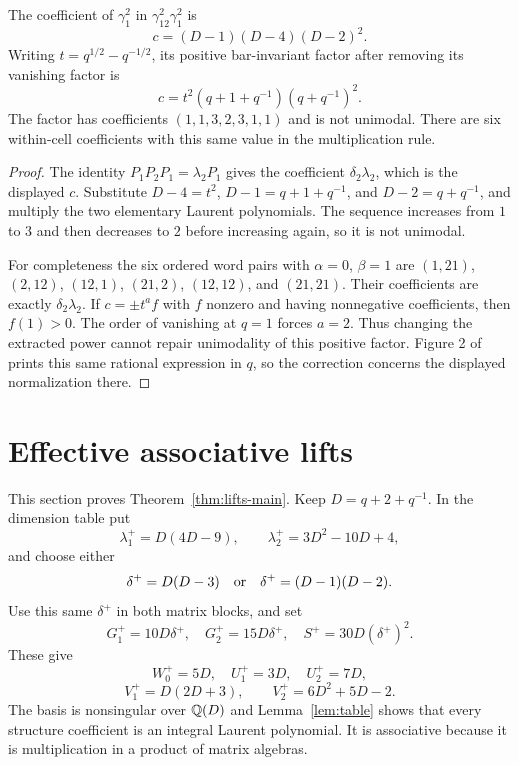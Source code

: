 \documentclass[11pt]{article}
\theoremstyle{definition}\newtheorem{definition}[theorem]{Definition}
\begin{document}
\begin{proposition}\label{prop:unimodality}
The coefficient of $\gamma_1^2$ in $\gamma_{12}^2\gamma_1^2$ is
\[
 c=(D-1)(D-4)(D-2)^2.
\]
Writing $t=q^{1/2}-q^{-1/2}$, its positive bar-invariant factor after removing its vanishing factor is
\[
 c=t^2(q+1+q^{-1})(q+q^{-1})^2.
\]
The factor has coefficients $(1,1,3,2,3,1,1)$ and is not unimodal. There are six within-cell coefficients with this same value in the multiplication rule.
\end{proposition}
\begin{proof}
The identity $P_1P_2P_1=\lambda_2P_1$ gives the coefficient $\delta_2\lambda_2$, which is the displayed $c$. Substitute $D-4=t^2$, $D-1=q+1+q^{-1}$, and $D-2=q+q^{-1}$, and multiply the two elementary Laurent polynomials. The sequence increases from $1$ to $3$ and then decreases to $2$ before increasing again, so it is not unimodal.

For completeness the six ordered word pairs with $\alpha=0$, $\beta=1$ are $(1,21)$, $(2,12)$, $(12,1)$, $(21,2)$, $(12,12)$, and $(21,21)$. Their coefficients are exactly $\delta_2\lambda_2$. If $c=\pm t^a f$ with $f$ nonzero and having nonnegative coefficients, then $f(1)>0$. The order of vanishing at $q=1$ forces $a=2$. Thus changing the extracted power cannot repair unimodality of this positive factor. Figure 2 of \citet{Mulmuley} prints this same rational expression in $q$, so the correction concerns the displayed normalization there.
\end{proof}

\section{Effective associative lifts}\label{sec:lifts}
This section proves Theorem~\ref{thm:lifts-main}. Keep $D=q+2+q^{-1}$. In the dimension table put
\[
 \lambda_1^+=D(4D-9),\qquad\lambda_2^+=3D^2-10D+4,
\]
and choose either
\[
 \delta^+=D(D-3)\quad\hbox{or}\quad\delta^+=(D-1)(D-2).
\]
Use this same $\delta^+$ in both matrix blocks, and set
\[
 G_1^+=10D\delta^+,\quad G_2^+=15D\delta^+,\quad
 S^+=30D(\delta^+)^2.
\]
These give
\[
 W_0^+=5D,\quad U_1^+=3D,\quad U_2^+=7D,
\]
\[
 V_1^+=D(2D+3),\qquad V_2^+=6D^2+5D-2.
\]
The basis is nonsingular over $\mathbb Q(D)$ and Lemma~\ref{lem:table} shows that every structure coefficient is an integral Laurent polynomial. It is associative because it is multiplication in a product of matrix algebras.
\end{document}
